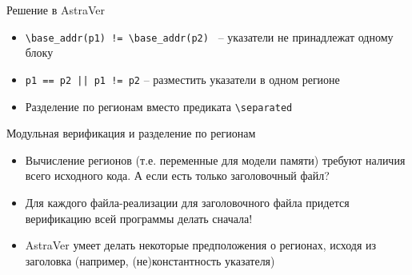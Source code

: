 \documentclass[hyperref={unicode=true}]{beamer}
\begin{document}
    \begin{frame}{Решение в AstraVer}
    \begin{itemize}
    \item
    \texttt{\textbackslash{}base\_addr(p1) != \textbackslash{}base\_addr(p2)
    } -- указатели не принадлежат одному блоку
    \item
    \texttt{p1 == p2 || p1 != p2} -- разместить указатели
    в одном регионе
    \item
    Разделение по регионам вместо предиката \texttt{\textbackslash{}separated}
    \end{itemize}
    \end{frame}

    \begin{frame}{Модульная верификация и разделение по регионам}
    \begin{itemize}
    \item
    Вычисление регионов (т.е. переменные для модели памяти) требуют
    наличия всего исходного кода. А если есть только заголовочный файл?
    \item
    Для каждого файла-реализации для заголовочного файла
    придется верификацию всей программы делать сначала!
    \item
    AstraVer умеет делать некоторые предположения о регионах,
    исходя из заголовка (например, (не)константность указателя)
    \end{itemize}
    \end{frame}
\end{document}
